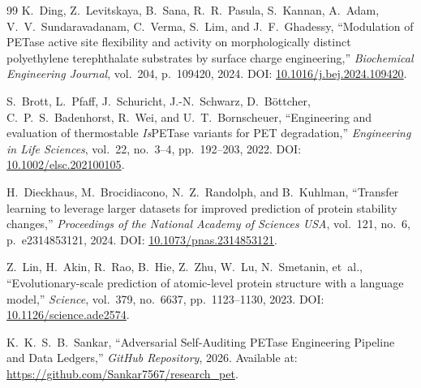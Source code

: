 \documentclass[10pt,twocolumn]{article}
\begin{document}
\begin{thebibliography}{99}
K.~Ding, Z.~Levitskaya, B.~Sana, R.~R.~Pasula, S.~Kannan, A.~Adam, V.~V.~Sundaravadanam, C.~Verma, S.~Lim, and J.~F.~Ghadessy,
``Modulation of PETase active site flexibility and activity on morphologically distinct polyethylene terephthalate substrates by surface charge engineering,''
\textit{Biochemical Engineering Journal}, vol.~204, p.~109420, 2024.
\newblock DOI: \href{https://doi.org/10.1016/j.bej.2024.109420}{10.1016/j.bej.2024.109420}.

S.~Brott, L.~Pfaff, J.~Schuricht, J.-N.~Schwarz, D.~B\"ottcher, C.~P.~S.~Badenhorst, R.~Wei, and U.~T.~Bornscheuer,
``Engineering and evaluation of thermostable \textit{Is}PETase variants for PET degradation,''
\textit{Engineering in Life Sciences}, vol.~22, no.~3--4, pp.~192--203, 2022.
\newblock DOI: \href{https://doi.org/10.1002/elsc.202100105}{10.1002/elsc.202100105}.

H.~Dieckhaus, M.~Brocidiacono, N.~Z.~Randolph, and B.~Kuhlman,
``Transfer learning to leverage larger datasets for improved prediction of protein stability changes,''
\textit{Proceedings of the National Academy of Sciences USA}, vol.~121, no.~6, p.~e2314853121, 2024.
\newblock DOI: \href{https://doi.org/10.1073/pnas.2314853121}{10.1073/pnas.2314853121}.

Z.~Lin, H.~Akin, R.~Rao, B.~Hie, Z.~Zhu, W.~Lu, N.~Smetanin, et~al.,
``Evolutionary-scale prediction of atomic-level protein structure with a language model,''
\textit{Science}, vol.~379, no.~6637, pp.~1123--1130, 2023.
\newblock DOI: \href{https://doi.org/10.1126/science.ade2574}{10.1126/science.ade2574}.

K.~K.~S.~B.~Sankar,
``Adversarial Self-Auditing PETase Engineering Pipeline and Data Ledgers,''
\textit{GitHub Repository}, 2026.
\newblock Available at: \url{https://github.com/Sankar7567/research_pet}.

\end{thebibliography}
\end{document}

